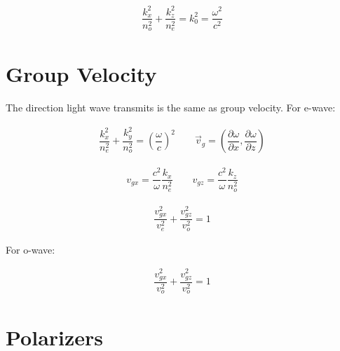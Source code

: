 \begin{equation*}
  \begin{aligned}
    \dfrac{k_x^2}{n_o^2} + \dfrac{k_z^2}{n_e^2} = k_0^2 = \dfrac{\omega^2}{c^2}   
  \end{aligned}
\end{equation*}

\section{Group Velocity}

The direction light wave transmits is the same as group velocity. For e-wave:

\begin{equation*}
  \begin{aligned}
    \dfrac{k_x^2}{n_e^2} + \dfrac{k_y^2}{n_o^2} = \left( \dfrac{\omega}{c}  \right)^2
    \quad\quad
    \vec{v}_g = \left( \dfrac{\partial \omega}{\partial x}, \dfrac{\partial \omega}{\partial z}   \right)
  \end{aligned}
\end{equation*}

\begin{equation*}
  \begin{aligned}
    v_{gx} = \dfrac{c^2}{\omega} \dfrac{k_x}{n_e^2} \quad\quad v_{gz} = \dfrac{c^2}{\omega} \dfrac{k_z}{n_o^2}    
  \end{aligned}
\end{equation*}

\begin{equation*}
  \begin{aligned}
    \dfrac{v_{gx}^2}{v_e^2} + \dfrac{v_{gz}^2}{v_o^2} = 1  
  \end{aligned}
\end{equation*}

For o-wave:

\begin{equation*}
  \begin{aligned}
    \dfrac{v_{gx}^2}{v_o^2} + \dfrac{v_{gz}^2}{v_o^2} = 1 
  \end{aligned}
\end{equation*}

\section{Polarizers}

